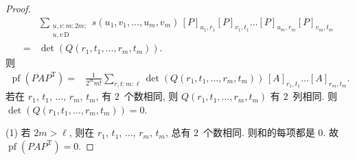 \documentclass[../libro.tex]{subfiles}
\begin{document}
\begin{proof}
\begin{align*}
        &
        \sum_{\substack{
                u, v \text{:}\, m \text{:}\, 2m; \\
                u, v \,\text{D}
        }}
        s(u_1, v_1, \dots, u_m, v_m)
        \,
        [P]_{u_1,r_1} [P]_{v_1,t_1} \dots [P]_{u_m,r_m} [P]_{v_m,t_m}
        \\
        = {} &
        \det {(Q(r_1, t_1, \dots, r_m, t_m))}.
    \end{align*}
    则
    \begin{align*}
        \operatorname{pf} {(P A P^{\mathrm{T}})}
        = {} &
        \frac{1}{2^m m!}
        \sum_{r, t \text{:}\, m \text{:}\, \ell}
        \det {(Q(r_1, t_1, \dots, r_m, t_m))}
        \,
        [A]_{r_1,t_1} \dots [A]_{r_m,t_m}.
    \end{align*}
    若在 \(r_1\), \(t_1\), \(\dots\), \(r_m\), \(t_m\),
    有 \(2\)~个数相同,
    则 \(Q(r_1, t_1, \dots, r_m, t_m)\) 有 \(2\)~列相同.
    则 \(\det {(Q(r_1, t_1, \dots, r_m, t_m))} = 0\).

    (1)
    若 \(2m > \ell\),
    则在 \(r_1\), \(t_1\), \(\dots\), \(r_m\), \(t_m\),
    总有 \(2\)~个数相同.
    则和的每项都是 \(0\).
    故 \(\operatorname{pf} {(P A P^{\mathrm{T}})} = 0\).


\end{proof}
\end{document}
